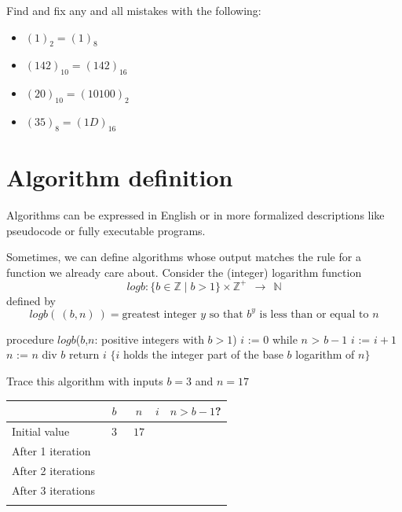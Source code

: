 \documentclass[12pt, oneside]{article}
\begin{document}
Find and fix any and all mistakes with the following:
\begin{itemize}
\item[(a)] $(1)_2 = (1)_8$
\item[(b)] $(142)_{10} = (142)_{16}$
\item[(c)] $(20)_{10} = (10100)_2$
\item[(d)] $(35)_8 = (1D)_{16}$
\end{itemize} \vfill
\section*{Algorithm definition}



Algorithms can be expressed in English or in more formalized descriptions like pseudocode or fully executable programs.


Sometimes, we can define algorithms whose output matches the 
rule for a function we already care about. Consider the (integer) logarithm function
\[
logb  : \{b \in \mathbb{Z} \mid b >1 \}  \times \mathbb{Z}^+ ~~\to~~ \mathbb{N}
\]
defined by 
\[
logb (~ (b,n)~) =  \text{greatest integer } y \text{ so that } b^y  \text{ is less than or equal to } n 
\]



\begin{algorithm}[caption={Calculating integer part of base $b$ logarithm}]
   procedure $logb$($b$,$n$: positive integers with $b > 1$)
   $i$ := $0$
   while $n$ > $b-1$
     $i$ := $i + 1$
     $n$ := $n$ div $b$
   return $i$ $\{ i$ holds the integer part of the base $b$ logarithm of $n\}$
\end{algorithm} 
Trace this algorithm with inputs $b=3$ and $n=17$

\vfill
  \begin{tabular}{l|c|c|c|c}
  & $b$ & $n$ & $i$  & $n > b-1$?\\
  \hline 
  Initial value & ~$3$~ & $17$ & \phantom{$0$} & \phantom{~Yes~}\\
  After 1 iteration  & \phantom{$3$} & \phantom{$5$} & \phantom{$1$} & \phantom{T}\\
  After 2 iterations & \phantom{$3$} & \phantom{$1$} & \phantom{$2$} & \phantom{F}\\
  After 3 iterations &  &  & & \\
  &&&&\\
  \end{tabular}
\end{document}
